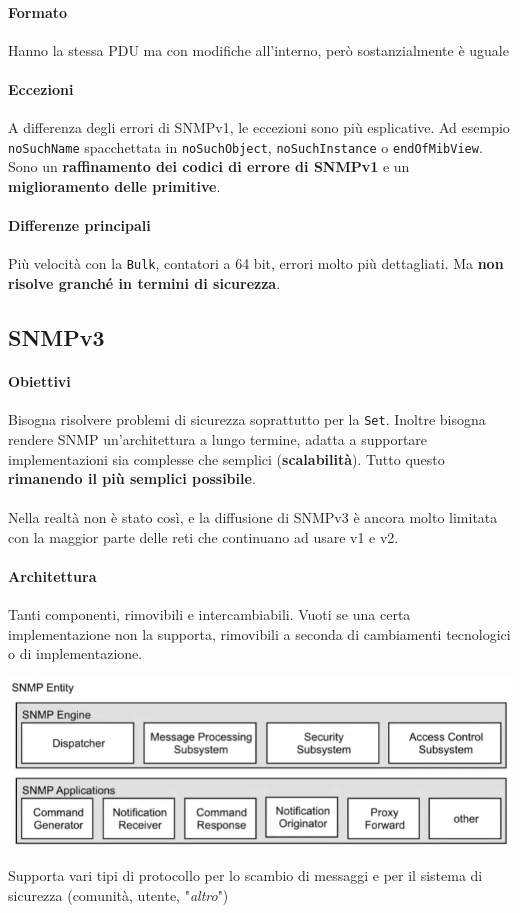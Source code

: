 \documentclass[10pt]{book}
\begin{document}
\paragraph{Formato} Hanno la stessa PDU ma con modifiche all'interno, però sostanzialmente è uguale
\paragraph{Eccezioni} A differenza degli errori di SNMPv1, le eccezioni sono più esplicative. Ad esempio \texttt{noSuchName} spacchettata in \texttt{noSuchObject}, \texttt{noSuchInstance} o \texttt{endOfMibView}. Sono un \textbf{raffinamento dei codici di errore di SNMPv1} e un \textbf{miglioramento delle primitive}.
\paragraph{Differenze principali} Più velocità con la \texttt{Bulk}, contatori a 64 bit, errori molto più dettagliati. Ma \textbf{non risolve granché in termini di sicurezza}.
\subsection{SNMPv3}
\paragraph{Obiettivi} Bisogna risolvere problemi di sicurezza soprattutto per la \texttt{Set}. Inoltre bisogna rendere SNMP un'architettura a lungo termine, adatta a supportare implementazioni sia complesse che semplici (\textbf{scalabilità}). Tutto questo \textbf{rimanendo il più semplici possibile}.\\\\
Nella realtà non è stato così, e la diffusione di SNMPv3 è ancora molto limitata con la maggior parte delle reti che continuano ad usare v1 e v2.
\paragraph{Architettura} Tanti componenti, rimovibili e intercambiabili. Vuoti se una certa implementazione non la supporta, rimovibili a seconda di cambiamenti tecnologici o di implementazione.
\begin{center}
	\includegraphics[scale=0.75]{snmp3.png}
\end{center}
Supporta vari tipi di protocollo per lo scambio di messaggi e per il sistema di sicurezza (comunità, utente, "\textit{altro}")
\end{document}
